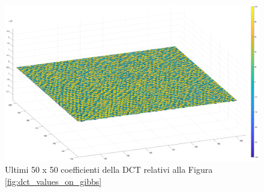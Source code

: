 \begin{figure}
	\centering
	\includegraphics[width=1\linewidth]{figures/last_dct_values.eps}

	\caption{Ultimi 50 x 50 coefficienti della DCT relativi alla Figura \ref{fig:dct_values_on_gibbs}}
	\label{fig:last_dct_values_gibbs}
\end{figure}